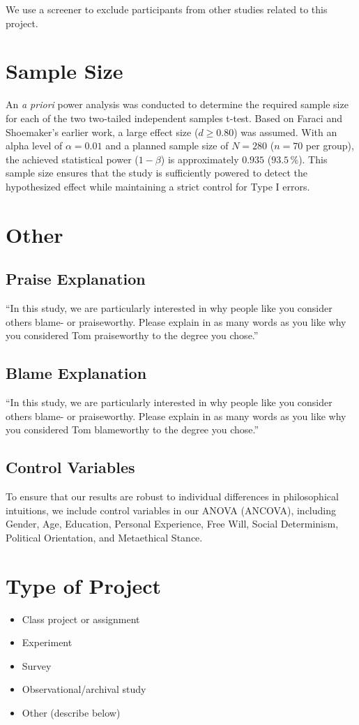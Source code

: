 \documentclass[scrarticle]{scrartcl}
\begin{document}
\noindent We use a screener to exclude participants from other studies related to this project.


\section{Sample Size}
An \textit{a priori} power analysis was conducted to determine the required sample size for each of the two two-tailed independent samples t-test.
Based on Faraci and Shoemaker's earlier work, a large effect size ($d \geq 0.80$) was assumed.
With an alpha level of $\alpha = 0.01$ and a planned sample size of $N = 280$ ($n = 70$ per group), the achieved statistical power ($1 - \beta$) is approximately $0.935$ ($93.5\,\%$).
This sample size ensures that the study is sufficiently powered to detect the hypothesized effect while maintaining a strict control for Type I errors.


\section{Other}


\subsection*{Praise Explanation}
\enquote{In this study, we are particularly interested in why people like you consider others blame- or praiseworthy.
Please explain in as many words as you like why you considered Tom praiseworthy to the degree you chose.}


\subsection*{Blame Explanation}
\enquote{In this study, we are particularly interested in why people like you consider others blame- or praiseworthy.
Please explain in as many words as you like why you considered Tom blameworthy to the degree you chose.}


\subsection*{Control Variables}
To ensure that our results are robust to individual differences in philosophical intuitions, we include control variables in our ANOVA (ANCOVA), including Gender, Age, Education, Personal Experience, Free Will, Social Determinism, Political Orientation, and Metaethical Stance.


\section{Type of Project}
\begin{itemize}[label=\Square,noitemsep]
   \item Class project or assignment
   \item[\XBox] Experiment
   \item Survey
   \item Observational/archival study
   \item Other (describe below)
\end{itemize}
\end{document}
